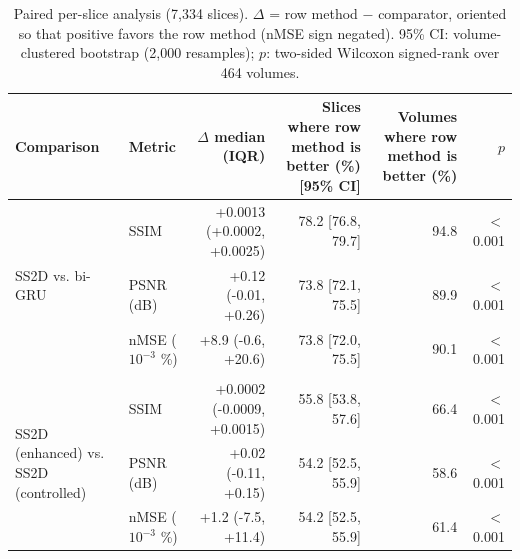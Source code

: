\begin{table}[ht]
\centering
\caption{Paired per-slice analysis (7{,}334 slices). $\Delta$ = row method $-$ comparator, oriented so that positive favors the row method (nMSE sign negated). 95\% CI: volume-clustered bootstrap (2{,}000 resamples); $p$: two-sided Wilcoxon signed-rank over 464 volumes.}
\label{tab:paired}
\begin{tabular}{llrrrr}
\toprule
Comparison & Metric & $\Delta$ median (IQR) & Slices where row method is better (\%) [95\% CI] & Volumes where row method is better (\%) & $p$ \\
\midrule
\multirow{3}{*}{SS2D vs. bi-GRU} & SSIM & +0.0013 (+0.0002, +0.0025) & 78.2 [76.8, 79.7] & 94.8 & $<$0.001 \\
 & PSNR (dB) & +0.12 (-0.01, +0.26) & 73.8 [72.1, 75.5] & 89.9 & $<$0.001 \\
 & nMSE ($10^{-3}$ \%) & +8.9 (-0.6, +20.6) & 73.8 [72.0, 75.5] & 90.1 & $<$0.001 \\
\midrule \\
\multirow{3}{*}{SS2D (enhanced) vs. SS2D (controlled)} & SSIM & +0.0002 (-0.0009, +0.0015) & 55.8 [53.8, 57.6] & 66.4 & $<$0.001 \\
 & PSNR (dB) & +0.02 (-0.11, +0.15) & 54.2 [52.5, 55.9] & 58.6 & $<$0.001 \\
 & nMSE ($10^{-3}$ \%) & +1.2 (-7.5, +11.4) & 54.2 [52.5, 55.9] & 61.4 & $<$0.001 \\
\bottomrule
\end{tabular}
\end{table}

